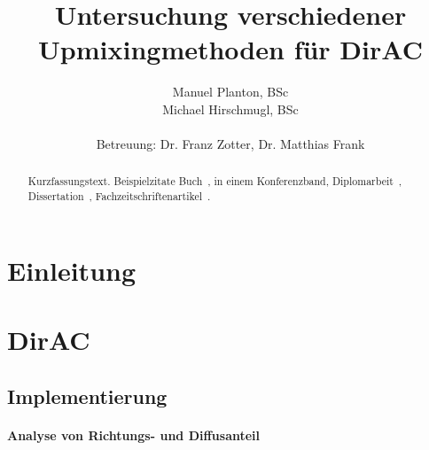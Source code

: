 \documentclass[12pt, a4paper]{article}
\begin{document}

\title{Untersuchung verschiedener Upmixingmethoden für DirAC}

\author{Manuel Planton, BSc \\ Michael Hirschmugl, BSc\\\\\small{Betreuung: Dr. Franz Zotter, Dr. Matthias Frank}}




\maketitle
\newpage
\pagestyle{empty}
\hspace{1cm}\vspace{3cm}

\hspace{1cm}\vspace{1cm}

\begin{abstract}
   Kurzfassungstext. Beispielzitate Buch~\cite{Williams}, in einem Konferenzband\cite{Avizienis06}, Diplomarbeit~\cite{Pomberger08}, Dissertation~\cite{Li05}, Fachzeitschriftenartikel~\cite{Weinreich80}.
\end{abstract}
\newpage
\pagestyle{myheadings}
\hspace{1cm}\vspace{2cm}

\tableofcontents
\newpage

\section{Einleitung}

\section{DirAC}
    \subsection{Implementierung}
    
        \paragraph{Analyse von Richtungs- und Diffusanteil}
        
\end{document}
